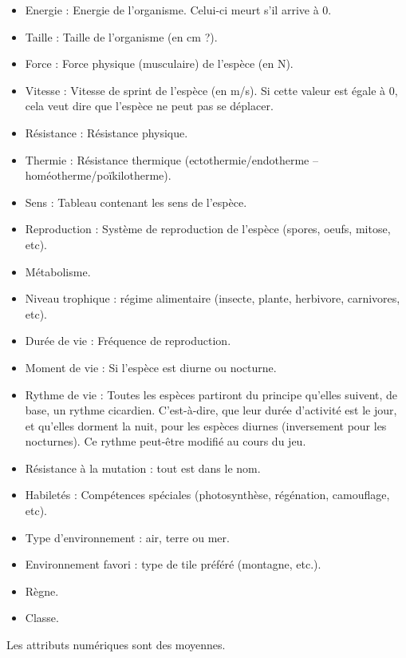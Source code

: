 \begin{itemize}
	\item Energie : Energie de l'organisme. Celui-ci meurt s'il arrive à 0.
	\item Taille : Taille de l'organisme (en cm ?).
	\item Force : Force physique (musculaire) de l'espèce (en N).
	\item Vitesse : Vitesse de sprint de l'espèce (en m/s). Si cette valeur est égale à 0, cela veut dire que l'espèce ne peut pas se déplacer.
	\item Résistance : Résistance physique.
	\item Thermie : Résistance thermique (ectothermie/endotherme -- homéotherme/poïkilotherme).
	\item Sens : Tableau contenant les sens de l'espèce.
	\item Reproduction : Système de reproduction de l'espèce (spores, oeufs, mitose, etc).
	\item Métabolisme.
	\item Niveau trophique : régime alimentaire (insecte, plante, herbivore, carnivores, etc).
	\item Durée de vie : Fréquence de reproduction.
	\item Moment de vie : Si l'espèce est diurne ou nocturne.
	\item Rythme de vie : Toutes les espèces partiront du principe qu'elles suivent, de base, un rythme cicardien. C'est-à-dire, que leur durée d'activité est le jour, et qu'elles dorment la nuit, pour les espèces diurnes (inversement pour les nocturnes). Ce rythme peut-être modifié au cours du jeu.
	\item Résistance à la mutation : tout est dans le nom.
	\item Habiletés : Compétences spéciales (photosynthèse, régénation, camouflage, etc).
	\item Type d'environnement : air, terre ou mer.
	\item Environnement favori : type de tile préféré (montagne, etc.).
	\item Règne.
	\item Classe. 
\end{itemize}
Les attributs numériques sont des moyennes.
